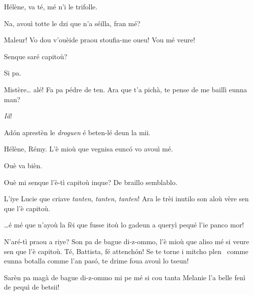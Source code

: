 \begin{drama}
\Remyspeaks Hélène, va té, mé n'i le trifolle.

\Helenespeaks Na, avouì totte le dzi que n'a séilla, fran mé?

\Cesarspeaks{} Maleur! Vo dou v'ouèide praou stoufia-me oueu! Vou mé veure!


\Hermannspeaks{} Senque saré capitoù?

\Peterspeaks Si pa.

\Hermannspeaks Mistère\ldots {} alé! Fa pa pédre de ten. Ara que t'a pichà, te pense de me baillì eunna man?

\Peterspeaks \textit{Ià}!

\Hermannspeaks Ad\'on aprestèn le \textit{droguen} é beten-lé deun la mii.



\Cesarspeaks{} Hélène, Rémy. L'è mioù que vegnisa eunc\'o vo avouì mé.

\Remyspeaks Ouè va bièn.




\Germainespeaks Ouè mi senque l’è-tì capitoù inque? De braillo semblablo. 

\Hermannspeaks L'iye Lucie que criave \textit{tanten}, \textit{tanten}, \textit{tanten}! Ara le trèi i\-nu\-tilo son aloù vère sen que l'è capitoù.

\Battistaspeaks  \ldots é mé que n’ayoù la fèi que fusse itoù lo gadeun a queryì pequé l’ie panco mor!


\Germainespeaks N’aré-tì praou a riye? Son pa de bague di-z-ommo, l'è mioù que aliso mé si veure sen que l’è capitoù. Té, Battista, fé attench\'on! Se te torne i mitcho plen \pion\ comme eunna botalla comme l'an pas\'o, te drime foua avouì lo tseun! 


\Battistaspeaks  Sarèn pa magà de bague di-z-ommo mi pe mé si cou tanta Melanie l’a belle fenì de pequì de betsii! 


\end{drama}
